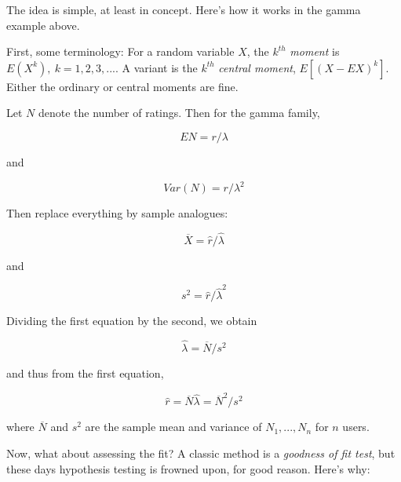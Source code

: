 The idea is simple, at least in concept.  Here's how it works in the
gamma example above.

First, some terminology:  For a random variable $X$, the $k^{th}$
\textit{moment} is $E(X^k),~ k=1,2,3,...$.  A variant is the $k^{th}$
\textit{central moment}, $E[(X - EX)^k]$.  Either the ordinary or
central moments are fine.

Let $N$ denote the number of ratings.  Then for the gamma family,

\begin{equation}
EN = r/\lambda
\end{equation}

and

\begin{equation}
Var(N) = r/\lambda^2
\end{equation}

Then replace everything by sample analogues:

\begin{equation}
\overline{X} = \widehat{r} / \widehat{\lambda}
\end{equation}

and

\begin{equation}
s^2 = \widehat{r} / \widehat{\lambda}^2
\end{equation}

Dividing the first equation by the second, we obtain

\begin{equation}
\widehat{\lambda} = \overline{N} / s^2
\end{equation}

and thus from the first equation,

\begin{equation}
\widehat{r} = \overline{N} \widehat{\lambda} = \overline{N}^2 / s^2
\end{equation}

where $ \overline{N}$ and $s^2$ are the sample mean and variance of
$N_1,...,N_n$ for $n$ users.

Now, what about assessing the fit?  A classic method is a
\textit{goodness of fit test}, but these days hypothesis testing is
frowned upon, for good reason.  Here's why:


